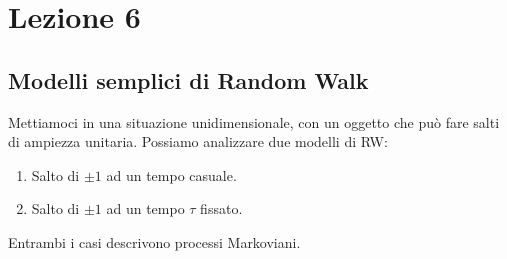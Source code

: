 \section{Lezione 6}%
\label{sub:Lezione 6}

\subsection{Modelli semplici di Random Walk}%
\label{sub:Random Walk}

Mettiamoci in una situazione unidimensionale, con un oggetto che può fare salti di ampiezza unitaria.
%
Possiamo analizzare due modelli di RW:
\begin{enumerate}
    \item Salto di $\pm 1$ ad un tempo casuale.
    \item Salto di $\pm 1$ ad un tempo $\tau$ fissato.
\end{enumerate}
Entrambi i casi descrivono processi Markoviani.

